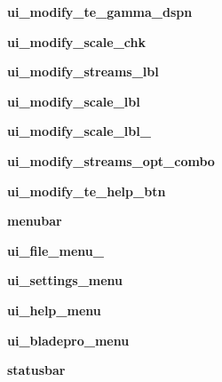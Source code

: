 \begin{DoxyCompactItemize}
\item 
\hypertarget{a00075_a4ca63b2a637cf38364b19f24c8285b50}{}\label{a00075_a4ca63b2a637cf38364b19f24c8285b50} 
{\bfseries ui\+\_\+modify\+\_\+te\+\_\+gamma\+\_\+dspn}
\item 
\hypertarget{a00075_a8223e458d886d632e1e32eebe1660ccd}{}\label{a00075_a8223e458d886d632e1e32eebe1660ccd} 
{\bfseries ui\+\_\+modify\+\_\+scale\+\_\+chk}
\item 
\hypertarget{a00075_ad2a466e412f8814a818109b3da354bfe}{}\label{a00075_ad2a466e412f8814a818109b3da354bfe} 
{\bfseries ui\+\_\+modify\+\_\+streams\+\_\+lbl}
\item 
\hypertarget{a00075_a5479dc39259c17b5db0877712f530e02}{}\label{a00075_a5479dc39259c17b5db0877712f530e02} 
{\bfseries ui\+\_\+modify\+\_\+scale\+\_\+lbl}
\item 
\hypertarget{a00075_a92fe24b218066d90fc276b44b16d0512}{}\label{a00075_a92fe24b218066d90fc276b44b16d0512} 
{\bfseries ui\+\_\+modify\+\_\+scale\+\_\+lbl\+\_}
\item 
\hypertarget{a00075_a0f38b3177af34fbc4c1d75de6572ab57}{}\label{a00075_a0f38b3177af34fbc4c1d75de6572ab57} 
{\bfseries ui\+\_\+modify\+\_\+streams\+\_\+opt\+\_\+combo}
\item 
\hypertarget{a00075_a19f92f3e51261adf29b1f0082cd54d3c}{}\label{a00075_a19f92f3e51261adf29b1f0082cd54d3c} 
{\bfseries ui\+\_\+modify\+\_\+te\+\_\+help\+\_\+btn}
\item 
\hypertarget{a00075_a798cd0741b801dadeed104d005b5f175}{}\label{a00075_a798cd0741b801dadeed104d005b5f175} 
{\bfseries menubar}
\item 
\hypertarget{a00075_a740ccb90eb10230354d8eaefa8b0370f}{}\label{a00075_a740ccb90eb10230354d8eaefa8b0370f} 
{\bfseries ui\+\_\+file\+\_\+menu\+\_\+}
\item 
\hypertarget{a00075_a487ed7e13e1d89fb7de06543d9148794}{}\label{a00075_a487ed7e13e1d89fb7de06543d9148794} 
{\bfseries ui\+\_\+settings\+\_\+menu}
\item 
\hypertarget{a00075_abcdec0fbee6392eec333564f58dcf14c}{}\label{a00075_abcdec0fbee6392eec333564f58dcf14c} 
{\bfseries ui\+\_\+help\+\_\+menu}
\item 
\hypertarget{a00075_ac514400aee7c0639a535f14d4966bd23}{}\label{a00075_ac514400aee7c0639a535f14d4966bd23} 
{\bfseries ui\+\_\+bladepro\+\_\+menu}
\item 
\hypertarget{a00075_a0333719e7851f78d90e68e2c94b7ab6c}{}\label{a00075_a0333719e7851f78d90e68e2c94b7ab6c} 
{\bfseries statusbar}
\item 
\hypertarget{a00075_a2e4dd6cf3c5c6f7a6a5b9d1aa3b74243}{}\label{a00075_a2e4dd6cf3c5c6f7a6a5b9d1aa3b74243} 

\end{DoxyCompactItemize}

